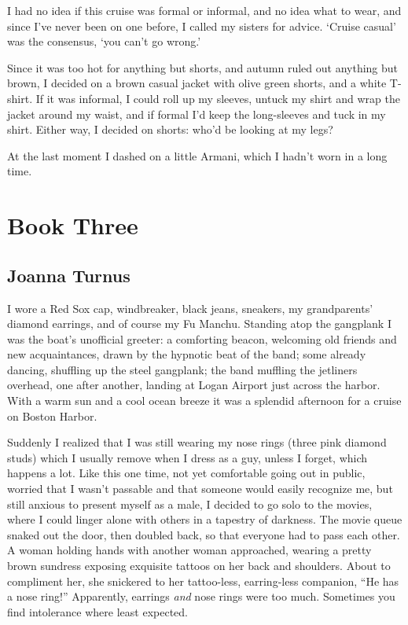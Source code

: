 I had no idea if this cruise was formal or informal, and no idea what to
wear, and since I've never been on one before, I called my sisters for
advice. `Cruise casual' was the consensus, `you can't go wrong.'

Since it was too hot for anything but shorts, and autumn ruled out
anything but brown, I decided on a brown casual jacket with olive green
shorts, and a white T-shirt. If it was informal, I could roll up my
sleeves, untuck my shirt and wrap the jacket around my waist, and if
formal I'd keep the long-sleeves and tuck in my shirt. Either way, I
decided on shorts: who'd be looking at my legs?

At the last moment I dashed on a little Armani, which I hadn't worn in a
long time.

\part{Book Three}

\chapter{Joanna Turnus}

\titlemark

I wore a Red Sox cap, windbreaker, black jeans, sneakers, my
grandparents' diamond earrings, and of course my Fu Manchu. Standing
atop the gangplank I was the boat's unofficial greeter: a comforting
beacon, welcoming old friends and new acquaintances, drawn by the
hypnotic beat of the band; some already dancing, shuffling up the steel
gangplank; the band muffling the jetliners overhead, one after another,
landing at Logan Airport just across the harbor. With a warm sun and a
cool ocean breeze it was a splendid afternoon for a cruise on Boston
Harbor.

Suddenly I realized that I was still wearing my nose rings (three pink
diamond studs) which I usually remove when I dress as a guy, unless I
forget, which happens a lot. Like this one time, not yet comfortable
going out in public, worried that I wasn't passable and that someone
would easily recognize me, but still anxious to present myself as a
male, I decided to go solo to the movies, where I could linger alone
with others in a tapestry of darkness. The movie queue snaked out the
door, then doubled back, so that everyone had to pass each other. A
woman holding hands with another woman approached, wearing a pretty
brown sundress exposing exquisite tattoos on her back and shoulders.
About to compliment her, she snickered to her tattoo-less, earring-less
companion, ``He has a nose ring!'' Apparently, earrings \emph{and} nose
rings were too much. Sometimes you find intolerance where least
expected.

